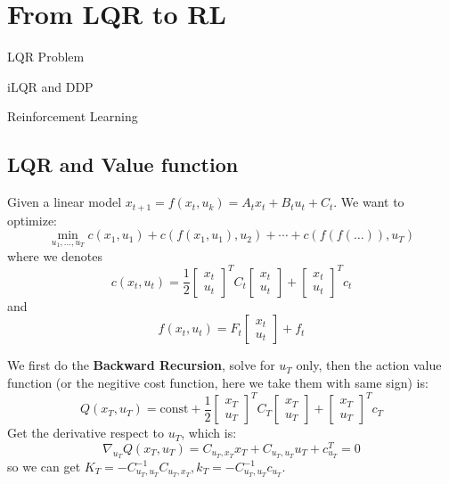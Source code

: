 \documentclass[10pt]{elegantbook}
\begin{document}
\chapter{From LQR to RL}

\begin{introduction}
    \item LQR Problem
    \item iLQR and DDP
    \item Reinforcement Learning
\end{introduction}

\section{LQR and Value function}

Given a linear model $x_{t+1} = f(x_t, u_k) = A_t x_t + B_t u_t + C_t$. We want to optimize:
\[ \min_{u_1, \ldots, u_T} c(x_1, u_1) + c(f(x_1, u_1), u_2) + \cdots + c(f(f(\ldots)), u_T) \]
where we denotes 
\[ c(x_t, u_t) = \frac{1}{2} 
\begin{bmatrix}
    x_t \\ 
    u_t
\end{bmatrix}^T C_t 
\begin{bmatrix}
    x_t \\ 
    u_t
\end{bmatrix}
+
\begin{bmatrix}
    x_t \\ 
    u_t
\end{bmatrix}^T c_t
\]
and 
\[ f(x_t, u_t) 
= F_t
\begin{bmatrix}
    x_t \\ 
    u_t
\end{bmatrix}
+ f_t
\]

We first do the \textbf{Backward Recursion}, solve for $u_T$ only, then the action value function (or the negitive cost function, here
we take them with same sign) is:
\[ Q(x_T, u_T) = \text{const} +
\frac{1}{2} 
\begin{bmatrix}
    x_T \\ 
    u_T
\end{bmatrix}^T C_T
\begin{bmatrix}
    x_T \\ 
    u_T
\end{bmatrix} + 
\begin{bmatrix}
    x_T \\ 
    u_T
\end{bmatrix}^T c_T
\]
Get the derivative respect to $u_T$, which is:
\[ \nabla_{u_T} Q(x_T, u_T) = C_{u_T, x_T}x_T + C_{u_T,u_T}u_T + c_{u_T}^T = 0 \]
so we can get $K_T = -C_{u_T,u_T}^{-1}C_{u_T, x_T}, k_T = -C_{u_T,u_T}^{-1}c_{u_T}$.
\end{document}
